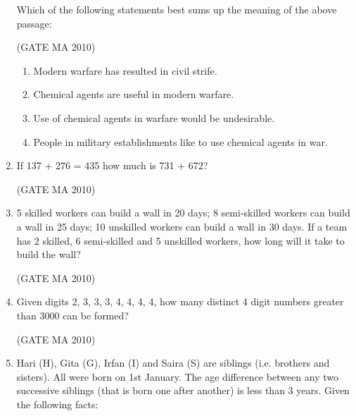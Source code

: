 \documentclass[journal,12pt,onecolumn]{IEEEtran}
\theoremstyle{remark}
\begin{document}
\begin{flushleft}
\begin{enumerate}
Which of the following statements best sums up the meaning of the above passage:

\hfill(GATE MA 2010)

\begin{enumerate}
\item Modern warfare has resulted in civil strife.
\item Chemical agents are useful in modern warfare.
\item Use of chemical agents in warfare would be undesirable.
\item People in military establishments like to use chemical agents in war.
\end{enumerate}

\item If 137 + 276 = 435 how much is 731 + 672?

\hfill(GATE MA 2010)

\begin{enumerate}
\end{enumerate}

\item 5 skilled workers can build a wall in 20 days; 8 semi-skilled workers can build a wall in 25 days; 10 unskilled workers can build a wall in 30 days. If a team has 2 skilled, 6 semi-skilled and 5 unskilled workers, how long will it take to build the wall?

\hfill(GATE MA 2010)

\begin{enumerate}
\end{enumerate}

\item Given digits 2, 3, 3, 3, 4, 4, 4, 4, how many distinct 4 digit numbers greater than 3000 can be formed?

\hfill(GATE MA 2010)

\begin{enumerate}
\end{enumerate}
\newpage
\item Hari (H), Gita (G), Irfan (I) and Saira (S) are siblings (i.e. brothers and sisters). All were born on 1st January. The age difference between any two successive siblings (that is born one after another) is less than 3 years. Given the following facts:


\end{enumerate}
\end{flushleft}
\end{document}
